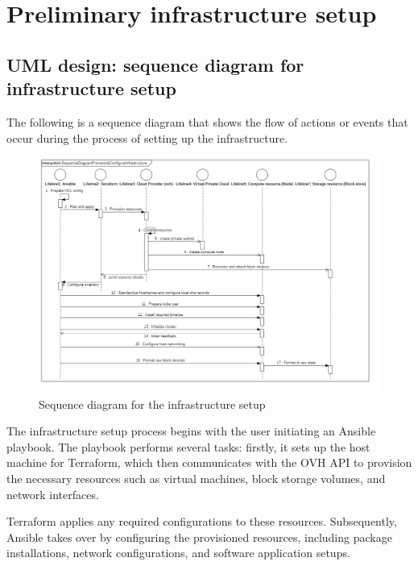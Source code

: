 \section{Preliminary infrastructure setup}

\subsection{UML design: sequence diagram for infrastructure setup}

\hspace{7mm}The following is a sequence diagram that shows the flow of actions or events that occur during the process of setting up the infrastructure.

\begin{figure}[H]\centering
\includegraphics[width=1.0\textwidth,angle=00]{assets/f16.png}
\caption{Sequence diagram for the infrastructure setup}
\label{fig:Sequence diagram for infrastructure setup}
\end{figure}


\hspace{7mm}The infrastructure setup process begins with the user initiating an Ansible playbook. The playbook performs several tasks: firstly, it sets up the host machine for Terraform, which then communicates with the OVH API to provision the necessary resources such as virtual machines, block storage volumes, and network interfaces.

\hspace{7mm}Terraform applies any required configurations to these resources. Subsequently, Ansible takes over by configuring the provisioned resources, including package installations, network configurations, and software application setups.

